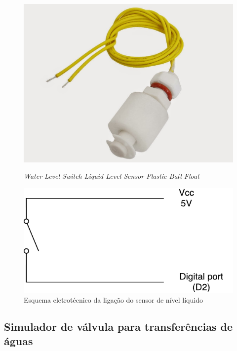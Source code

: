 \begin{figure}[h]
	\centering
	\begin{minipage}[b]{0.4\textwidth}
		\includegraphics[width=\textwidth]{img/hardware/liquido.JPG}
		\caption{\textit{Water Level Switch Liquid Level Sensor Plastic Ball Float}}
	\end{minipage}
	\hfill
	\begin{minipage}[b]{0.4\textwidth}
		\includegraphics[width=\textwidth]{img/hardware/sw_esquema.pdf}
		\caption{Esquema eletrotécnico da ligação do sensor de nível líquido}
		\label{esquem-liquido}
	\end{minipage}
\end{figure}




\subsection{Simulador de válvula para transferências de águas}

